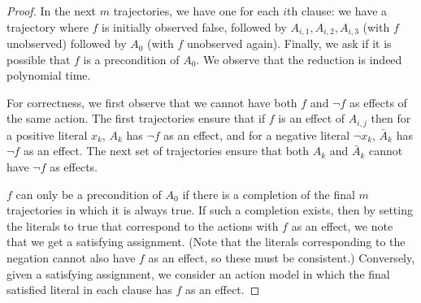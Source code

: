 \documentclass[letterpaper]{article} %
\begin{document}
{\begin{proof}
In the next $m$ trajectories, we have one for each $i$th clause: we have a trajectory where $f$ is initially observed false, followed by $A_{i,1},A_{i,2},A_{i,3}$ (with $f$ unobserved) followed by $A_0$ (with $f$ unobserved again). Finally, we ask if it is possible that $f$ is a precondition of $A_0$. We observe that the reduction is indeed polynomial time.

For correctness, we first observe that we cannot have both $f$ and $\neg f$ as effects of the same action. 
The first trajectories ensure that if $f$ is an effect of $A_{i,j}$ then for a positive literal $x_k$, $A_k$ has $\neg f$ as an effect, and for a negative literal $\neg x_k$, $\bar{A}_k$ has $\neg f$ as an effect.
The next set of trajectories ensure that both $A_k$ and $\bar{A}_k$ cannot have $\neg f$ as effects.

$f$ can only be a precondition of $A_0$ if there is a completion of the final $m$ trajectories in which it is always true. If such a completion exists, then by setting the literals to true that correspond to the actions with $f$ as an effect, we note that we get a satisfying assignment. (Note that the literals corresponding to the negation cannot also have $f$ as an effect, so these must be consistent.) Conversely, given a satisfying assignment, we consider an action model in which the final satisfied literal in each clause has $f$ as an effect.
\end{proof}
}\fi


% 
\end{document}
